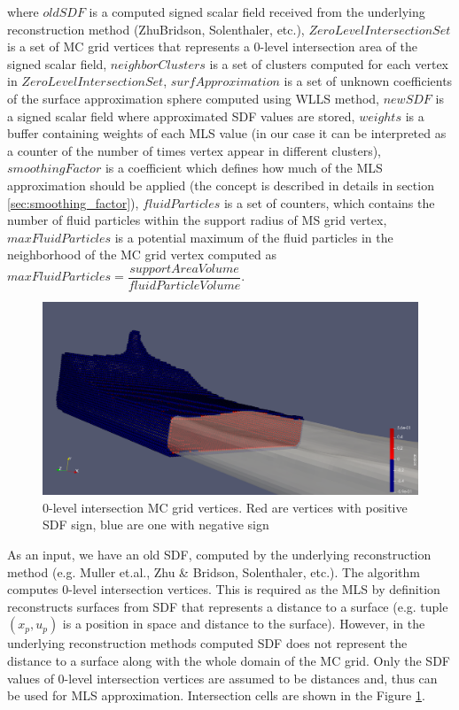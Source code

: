where $oldSDF$ is a computed signed scalar field received from the underlying reconstruction method (ZhuBridson, Solenthaler, etc.), $ZeroLevelIntersectionSet$ is a set of MC grid vertices that represents a 0-level intersection area of the signed scalar field, $neighborClusters$ is a set of clusters computed for each vertex in $ZeroLevelIntersectionSet$, $surfApproximation$ is a set of unknown coefficients of the surface approximation sphere computed using WLLS method, $newSDF$ is a signed scalar field where approximated SDF values are stored, $weights$ is a buffer containing weights of each MLS value (in our case it can be interpreted as a counter of the number of times vertex appear in different clusters), $smoothingFactor$ is a coefficient which defines how much of the MLS approximation should be applied (the concept is described in details in section \ref{sec:smoothing_factor}), $fluidParticles$ is a set of counters, which contains the number of fluid particles within the support radius of MS grid vertex, $maxFluidParticles$ is a potential maximum of the fluid particles in the neighborhood of the MC grid vertex computed as $maxFluidParticles = \dfrac{supportAreaVolume}{fluidParticleVolume}$.\\
\begin{figure}[H]
	\begin{center}
		\includegraphics[width=\textwidth]{figures/MlsIntersectionVertexSet.png}
	\end{center}
	\caption{0-level intersection MC grid vertices. Red are vertices with positive SDF sign, blue are one with negative sign}
	\label{fig:intersection_vertices}
\end{figure}
As an input, we have an old SDF, computed by the underlying reconstruction method (e.g. Muller et.al., Zhu \& Bridson, Solenthaler, etc.). The algorithm computes 0-level intersection vertices. This is required as the MLS by definition reconstructs surfaces from SDF that represents a distance to a surface (e.g. tuple $(x_p, u_p)$ is a position in space and distance to the surface). However, in the underlying reconstruction methods computed SDF does not represent the distance to a surface along with the whole domain of the MC grid. Only the SDF values of 0-level intersection vertices are assumed to be distances and, thus can be used for MLS approximation. Intersection cells are shown in the Figure \ref{fig:intersection_vertices}.\\

